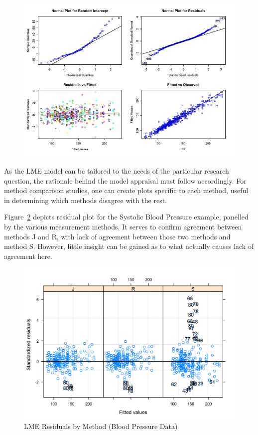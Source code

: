 \documentclass[12pt, a4paper]{report}
\theoremstyle{definition}
\theoremstyle{remark}
\begin{document}
\begin{figure}[h!]
	\centering
	\includegraphics[width=0.9\linewidth]{images/ResidPlot}
	\caption{}
	\label{fig:ResidPlot}
\end{figure}

As the LME model can be tailored to the needs of the particular research question, the rationale behind the model appraisal must follow accordingly. 
For method comparison studies, one can create plots specific to each method, useful in determining which methods disagree with the rest.
 	
Figure~\ref{bloodnlme-ResidPlot} depicts residual plot for the Systolic Blood Pressure example, panelled by the various measurement methods. It serves to confirm agreement between methods J and R, with lack of agreement between those two methods and method S. However, little insight can be gained as to what actually causes lack of agreement here. 
\begin{figure}[h!]
		\centering
		\includegraphics[width=0.8\linewidth]{images/bloodnlme-ResidPlot}
		\caption{LME Residuals by Method (Blood Pressure Data)}
		\label{bloodnlme-ResidPlot}
\end{figure}
\end{document}
